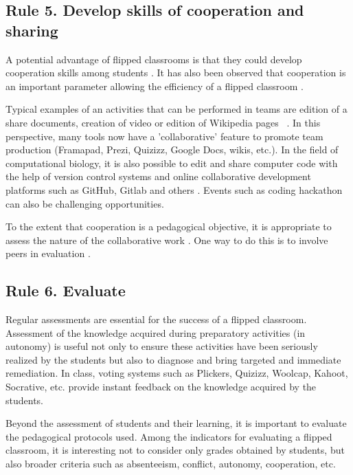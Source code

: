 \documentclass[10pt,letterpaper]{article}
\begin{document}
\subsection{Rule 5. Develop skills of cooperation and sharing}

A potential advantage of flipped classrooms is that they could develop cooperation skills among students \cite{strayer_how_2012}. 
It has also been observed that cooperation is an important parameter allowing the efficiency of a flipped classroom \cite{foldnes_flipped_2016}.

Typical examples of an activities that can be performed in teams are edition of a share documents, creation of video or edition of Wikipedia pages ~\cite{logan_ten_2010}. In this perspective, many tools now have a 'collaborative' feature to promote team production (Framapad, Prezi, Quizizz, Google Docs, wikis, etc.). 
In the field of computational biology, it is also possible to edit and share computer code \cite{abdollahi2018meet} with the help of version control systems and online collaborative development platforms such as GitHub, Gitlab and others \cite{blischak_quick_2016}. Events such as coding hackathon can also be challenging opportunities.

To the extent that cooperation is a pedagogical objective, it is appropriate to assess the nature of the collaborative work \cite{lebrun_vers_2016}. One way to do this is to involve peers in evaluation \cite{lopez}.


\subsection{Rule 6. Evaluate}

Regular assessments are essential for the success of a flipped classroom. Assessment of the knowledge acquired during preparatory
activities (in autonomy) is useful not only to ensure these activities have been seriously realized by the students but also to diagnose 
and bring targeted and immediate remediation. 
In class, voting systems such as Plickers, Quizizz, Woolcap, Kahoot, Socrative, etc. provide instant feedback on the knowledge 
acquired by the students.

Beyond the assessment of students and their learning, it is important to evaluate the pedagogical protocols used. 
Among the indicators for evaluating a flipped classroom, it is interesting not to consider only grades obtained by students, 
but also broader criteria such as absenteeism, conflict, autonomy, cooperation, etc. 
\end{document}
